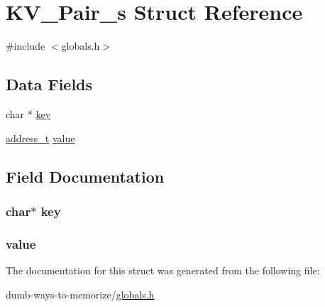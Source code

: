 \hypertarget{struct_k_v___pair__s}{}\section{K\+V\+\_\+\+Pair\+\_\+s Struct Reference}
\label{struct_k_v___pair__s}


{\ttfamily \#include $<$globals.\+h$>$}

\subsection*{Data Fields}
\begin{DoxyCompactItemize}
\item 
char $\ast$ \hyperlink{struct_k_v___pair__s_a5892a9181e6a332f84d27aecd41dcd12}{key}
\item 
\hyperlink{globals_8h_a2bc144218f3051b70834068a1d309e58}{address\+\_\+t} \hyperlink{struct_k_v___pair__s_ad0605b0b73ea8209a58c4bc55c974e26}{value}
\end{DoxyCompactItemize}


\subsection{Field Documentation}
\subsubsection[{\texorpdfstring{key}{key}}]{\setlength{\rightskip}{0pt plus 5cm}char$\ast$ key}\hypertarget{struct_k_v___pair__s_a5892a9181e6a332f84d27aecd41dcd12}{}\label{struct_k_v___pair__s_a5892a9181e6a332f84d27aecd41dcd12}
\subsubsection[{\texorpdfstring{value}{value}}]{ value}\hypertarget{struct_k_v___pair__s_ad0605b0b73ea8209a58c4bc55c974e26}{}\label{struct_k_v___pair__s_ad0605b0b73ea8209a58c4bc55c974e26}


The documentation for this struct was generated from the following file\+:\begin{DoxyCompactItemize}
\item 
dumb-\/ways-\/to-\/memorize/\hyperlink{globals_8h}{globals.\+h}\end{DoxyCompactItemize}
